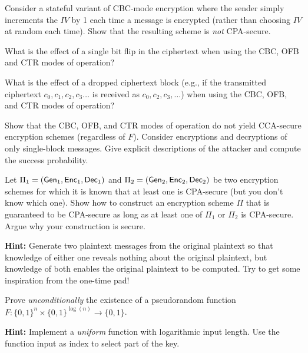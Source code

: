 \documentclass[a4paper,10pt,landscape,twocolumn]{scrartcl}
\begin{document}
\begin{exercise}
  Consider a stateful variant of CBC-mode encryption where the sender simply increments the $IV$ by 1 each time a message is encrypted (rather than choosing $IV$ at random each time). Show that the resulting scheme is \emph{not} CPA-secure.
\end{exercise}

\begin{exercise}
  \begin{subex}
    What is the effect of a single bit flip in the ciphertext when using the CBC, OFB and CTR modes of operation?
  \end{subex}
  \begin{subex}
    What is the effect of a dropped ciphertext block (e.g., if the transmitted ciphertext $c_0, c_1, c_2, c_3 \ldots$ is received as $c_0, c_2, c_3, \ldots$) when using the CBC, OFB, and CTR modes of operation?
  \end{subex}
\end{exercise}


\begin{exercise} Show that the CBC, OFB, and CTR modes of operation do not yield CCA-secure encryption schemes (regardless of $F$). Consider encryptions and decryptions of only single-block messages. Give explicit descriptions of the attacker and compute the success probability.
\end{exercise}

\begin{exercise}
  Let $\Pi_1 = (\mathsf{Gen}_1,\mathsf{Enc}_1, \mathsf{Dec}_1)$ and $\Pi_2 = (\mathsf{Gen}_2,\mathsf{Enc}_2, \mathsf{Dec}_2)$ be two encryption schemes for which it is known that at least one is CPA-secure (but you don't know which one). Show how to construct an encryption scheme $\Pi$ that is guaranteed to be CPA-secure as long as at least one of $\Pi_1$ or $\Pi_2$ is CPA-secure. Argue why your construction is secure.

  \textbf{Hint:} Generate two plaintext messages from the original plaintext so that knowledge of either one reveals nothing about the original plaintext, but knowledge of both enables the original plaintext to be computed. Try to get some inspiration from the one-time pad!
\end{exercise}


\begin{bonusexercise}
  Prove \emph{unconditionally} the existence of a pseudorandom function $F : \{0,1\}^{n} \times \{0,1\}^{\log(n)} \to \{0,1\}$.

  \textbf{Hint:} Implement a \emph{uniform} function with logarithmic input length. Use the function input as index to select part of the key.
\end{bonusexercise}
\end{document}

